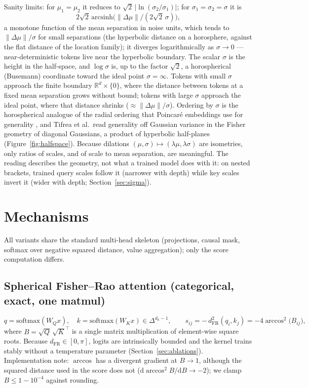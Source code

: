 \documentclass[11pt]{article}
\newcommand{\dFR}{d_{\mathrm{FR}}}
\begin{document}
Sanity limits: for $\mu_1 = \mu_2$ it reduces to $\sqrt{2}\,\lvert \ln(\sigma_2/\sigma_1)\rvert$; for $\sigma_1 = \sigma_2 = \sigma$ it is
\[
2\sqrt{2}\,\mathrm{arcsinh}\big(\lVert\Delta\mu\rVert / (2\sqrt{2}\,\sigma)\big),
\]
a monotone function of the mean separation in noise units, which tends to $\lVert\Delta\mu\rVert/\sigma$ for small separations (the hyperbolic distance on a horosphere, against the flat distance of the location family); it diverges logarithmically as $\sigma \to 0$ --- near-deterministic tokens live near the hyperbolic boundary. The scalar $\sigma$ is the height in the half-space, and $\log\sigma$ is, up to the factor $\sqrt{2}$, a horospherical (Busemann) coordinate toward the ideal point $\sigma = \infty$. Tokens with small $\sigma$ approach the finite boundary $\mathbb{R}^d \times \{0\}$, where the distance between tokens at a fixed mean separation grows without bound; tokens with large $\sigma$ approach the ideal point, where that distance shrinks ($\approx \lVert\Delta\mu\rVert/\sigma$). Ordering by $\sigma$ is the horospherical analogue of the radial ordering that Poincar\'e embeddings use for generality \cite{nickel2017}, and Tifrea et al.\ read generality off Gaussian variance in the Fisher geometry of diagonal Gaussians, a product of hyperbolic half-planes \cite{tifrea2019} (Figure~\ref{fig:halfspace}). Because dilations $(\mu, \sigma) \mapsto (\lambda\mu, \lambda\sigma)$ are isometries, only ratios of scales, and of scale to mean separation, are meaningful. The reading describes the geometry, not what a trained model does with it: on nested brackets, trained query scales follow it (narrower with depth) while key scales invert it (wider with depth; Section~\ref{sec:sigma}).

\section{Mechanisms}\label{sec:mechanisms}

All variants share the standard multi-head skeleton (projections, causal mask, softmax over negative squared distance, value aggregation); only the score computation differs.

\subsection{Spherical Fisher--Rao attention (categorical, exact, one matmul)}\label{sec:spherical}

\begin{equation*}
q = \mathrm{softmax}(W_Q x), \quad k = \mathrm{softmax}(W_K x) \in \Delta^{d_h - 1}, \qquad s_{ij} = -\,\dFR^2(q_i, k_j) = -4\arccos^2\!\big(B_{ij}\big),
\end{equation*}
where $B = \sqrt{Q}\,\sqrt{K}^{\top}$ is a single matrix multiplication of element-wise square roots. Because $\dFR \in [0, \pi]$, logits are intrinsically bounded and the kernel trains stably without a temperature parameter (Section~\ref{sec:ablations}). Implementation note: $\arccos$ has a divergent gradient at $B \to 1$, although the squared distance used in the score does not ($\mathrm{d}\arccos^2 B/\mathrm{d}B \to -2$); we clamp $B \le 1 - 10^{-4}$ against rounding.
\end{document}
